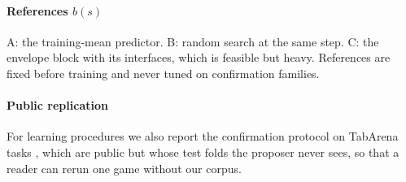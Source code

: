 \paragraph{References $b(s)$} A: the training-mean predictor. B: random search at the same step.
C: the envelope block with its interfaces, which is feasible but heavy. References are fixed before
training and never tuned on confirmation families.

\paragraph{Public replication} For learning procedures we also report the confirmation protocol on
TabArena tasks \citep{erickson2025tabarena}, which are public but whose test folds the proposer never
sees, so that a reader can rerun one game without our corpus.
